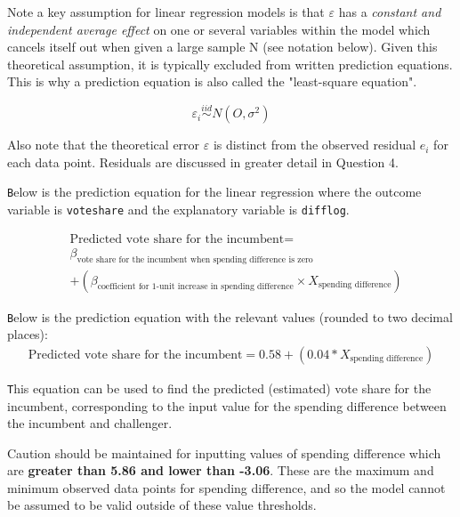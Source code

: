 \documentclass[12pt,letterpaper]{article}
\begin{document}
\begin{enumerate}
\begin{enumerate}
			Note a key assumption for linear regression models is that $\varepsilon$ has a \textit{constant and independent average effect} on one or several variables within the model which cancels itself out when given a large sample N (see notation below). Given this theoretical assumption, it is typically excluded from written prediction equations. This is why a prediction equation is also called the "least-square equation".
			
				$$\varepsilon_i \stackrel{iid}{\sim} N(O, \sigma^2)$$
			
			Also note that the theoretical error $\varepsilon$ is distinct from the observed residual $e_i$ for each data point. Residuals are discussed in greater detail in Question 4.
			
		\end{enumerate}
		
		\texttt Below is the prediction equation for the linear regression where the outcome variable is \texttt{voteshare} and the explanatory variable is \texttt{difflog}.
		
		\begin{align*}
			&\text{Predicted vote share for the incumbent} = \\ &\beta_\text{vote share for the incumbent when spending difference is zero} \\ &+ (\beta_\text{coefficient for 1-unit increase in spending difference} \times X_\text{spending difference})
		\end{align*}
		
		\texttt Below is the prediction equation with the relevant values (rounded to two decimal places):
		\begin{align*}
			\text{Predicted vote share for the incumbent} = 0.58 + (0.04 * X_\text{spending difference})
		\end{align*}
	
		\texttt This equation can be used to find the predicted (estimated) vote share for the incumbent, corresponding to the input value for the spending difference between the incumbent and challenger.
		
		Caution should be maintained for inputting values of spending difference which are \textbf{greater than 5.86 and lower than -3.06}. These are the maximum and minimum observed data points for spending difference, and so the model cannot be assumed to be valid outside of these value thresholds.
		
			
	
	\end{enumerate}
	
\end{document}

